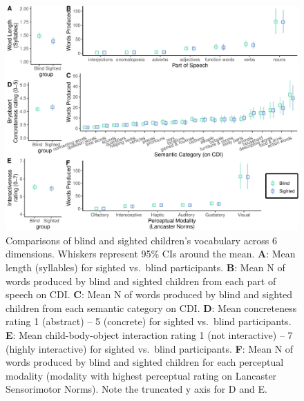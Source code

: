 \documentclass[
  man,floatsintext]{apa6}
\begin{document}
\begin{figure}
\centering
\includegraphics{VI_CDI_manuscript_files/figure-latex/vocab-comparison-1.pdf}
\caption{\label{fig:vocab-comparison}Comparisons of blind and sighted children's vocabulary across 6 dimensions. Whiskers represent 95\% CIs around the mean. \textbf{A}: Mean length (syllables) for sighted vs.~blind participants. \textbf{B}: Mean N of words produced by blind and sighted children from each part of speech on CDI. \textbf{C}: Mean N of words produced by blind and sighted children from each semantic category on CDI. \textbf{D}: Mean concreteness rating 1 (abstract) -- 5 (concrete) for sighted vs.~blind participants. \textbf{E}: Mean child-body-object interaction rating 1 (not interactive) -- 7 (highly interactive) for sighted vs.~blind participants. \textbf{F}: Mean N of words produced by blind and sighted children for each perceptual modality (modality with highest perceptual rating on Lancaster Sensorimotor Norms). Note the truncated y axis for D and E.}
\end{figure}
\end{document}
